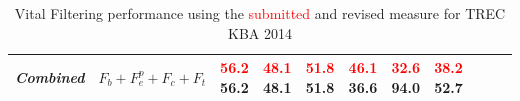 \documentclass{article}
\newcommand{\sub}[1]{\textcolor{red}{#1}}
\begin{document}
\begin{table}[tb]
{\begin{center}
\begin{tabular}{llccccccccc}
\hspace{2mm} {\textit{Combined}} & $F_b+F_e^p+F_c+F_t$ &
  \sub{56.2} \hspace{1mm} 56.2 & \sub{48.1} \hspace{1mm} 48.1 & \sub{51.8} \hspace{1mm} 51.8 &
  \sub{46.1} \hspace{1mm} 36.6 & \sub{32.6} \hspace{1mm} 94.0 & \sub{38.2} \hspace{1mm} 52.7 \\
 
\bottomrule
\end{tabular}
\end{center}
}
\caption{Vital Filtering performance using the \sub{submitted} and revised measure for TREC KBA 2014}
\label{officialRes}
\end{table}


\end{document}
